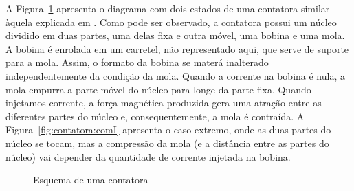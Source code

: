 \documentclass[a4paper]{article}
\theoremstyle{definition}
\theoremstyle{plain}
\begin{document}
A Figura~\ref{fig:contatora} apresenta o diagrama com dois estados de uma contatora similar àquela explicada em \cite{Faustino2020,meletrica2014}. Como pode ser observado, a contatora possui um núcleo dividido em duas partes, uma delas fixa e outra móvel, uma bobina e uma mola. A bobina é enrolada em um carretel, não representado aqui, que serve de suporte para a mola. Assim, o formato da bobina se materá inalterado independentemente da condição da mola. Quando a corrente na bobina é nula, a mola empurra a parte móvel do núcleo para longe da parte fixa. Quando injetamos corrente, a força magnética produzida gera uma atração entre as diferentes partes do núcleo e, consequentemente, a mola é contraída. A Figura~\ref{fig:contatora:comI} apresenta o caso extremo, onde as duas partes do núcleo se tocam, mas a compressão da mola (e a distância entre as partes do núcleo) vai depender da quantidade de corrente injetada na bobina.
%
\begin{figure}[H]
\centering
{}
\caption{Esquema de uma contatora}
\label{fig:contatora}
\end{figure}
\end{document}
